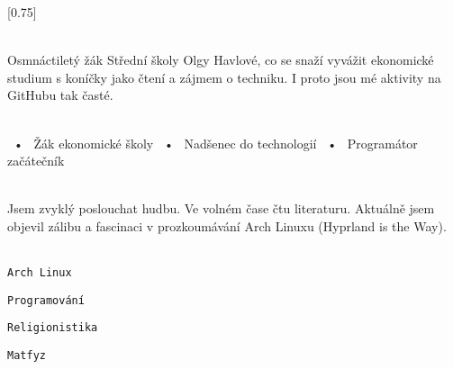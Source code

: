 \documentclass[verylight]{simplehipstercv}
\begin{document}
\setlength{\columnsep}{1.5cm}
[0.75]
\begin{paracol}{2}

\paracolbackgroundoptions



\footnotesize
{\setasidefontcolour
\flushright
{}

\\[0.5em]

{\footnotesize
Osmnáctiletý žák Střední školy Olgy Havlové, co se snaží vyvážit ekonomické studium s koníčky jako čtení a zájmem o techniku. I proto jsou mé aktivity na GitHubu tak časté.} \\
\bigskip

 \\[0.5em]

~•~ Žák ekonomické školy ~•~ Nadšenec do technologií ~•~ Programátor začátečník

\bigskip



\bigskip

\\[0.5em]

Jsem zvyklý poslouchat hudbu.
Ve volném čase čtu literaturu.
Aktuálně jsem objevil zálibu a fascinaci v prozkoumávání Arch Linuxu (Hyprland is the Way). \\
\bigskip

\\[0.5em]

\texttt{Arch Linux}

\texttt{Programování}

\texttt{Religionistika}

\texttt{Matfyz}

\vspace{4em}

 \\
\vspace{14em}

\phantom{turn the page}

}
\end{paracol}
\end{document}
